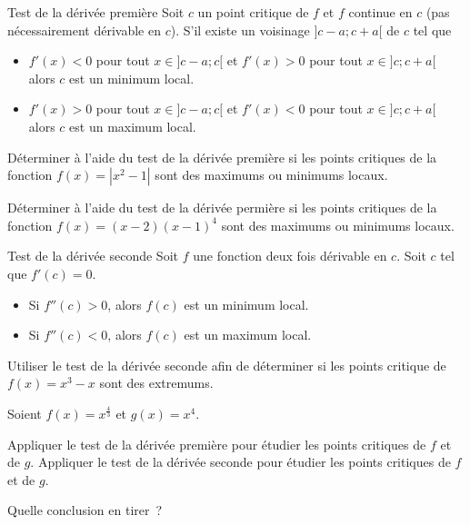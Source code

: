 \documentclass[a4paper,12pt]{article}
\begin{document}
\begin{methode}
	Test de la dérivée première
	\tcblower
	Soit $c$ un point critique de $f$ et $f$ continue en $c$ (pas nécessairement dérivable en $c$). S'il existe un voisinage $]c-a;c+a[$ de $c$ tel que
	\begin{itemize}
		\item $f'(x)<0$ pour tout $x\in ]c-a;c[$ et $f'(x)>0$ pour tout $x\in]c;c+a[$ alors $c$ est un minimum local.
		\item $f'(x)>0$ pour tout $x\in ]c-a;c[$ et $f'(x)<0$ pour tout $x\in]c;c+a[$ alors $c$ est un maximum local.
	\end{itemize}
\end{methode}
\begin{exemple}
	\tcblower
	Déterminer à l'aide du test de la dérivée première si les points critiques de la fonction $f(x)=|x^2-1|$ sont des maximums ou minimums locaux. 
	\vspace{10cm}
\end{exemple}
\begin{exemple}
	\tcblower
	Déterminer à l'aide du test de la dérivée permière si les points critiques de la fonction $f(x)=(x-2)(x-1)^4$ sont des maximums ou minimums locaux. 
	\vspace{7cm}
\end{exemple}
\begin{methode}
	Test de la dérivée seconde
	\tcblower
	Soit $f$ une fonction deux fois dérivable en $c$. Soit $c$ tel que $f'(c)=0$.
	\begin{itemize}
		\item Si $f''(c)>0$, alors $f(c)$ est un minimum local.
		\item Si $f''(c)<0$, alors $f(c)$ est un maximum local. 
	\end{itemize}
\end{methode}
\begin{exemple}
	\tcblower
	Utiliser le test de la dérivée seconde afin de déterminer si les points critique de $f(x)=x^3-x$ sont des extremums. 
	\vspace{10cm}
\end{exemple}
\begin{activite}
	\tcblower
	Soient $f(x)=x^{\frac{4}{3}}$ et $g(x)=x^4$. 
\begin{tasks}
\task 	Appliquer le test de la dérivée première pour étudier les points critiques de $f$ et de $g$.
\task 	Appliquer le test de la dérivée seconde pour étudier les points critiques de $f$ et de $g$.
\end{tasks}
Quelle conclusion en tirer~?
\end{activite}
\end{document}
